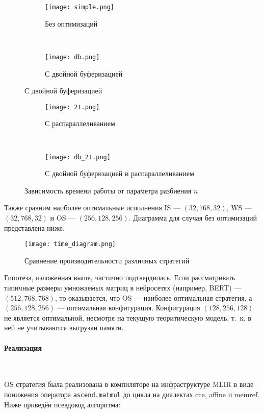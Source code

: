 \begin{figure}[h!]
    \centering
    \begin{subfigure}{0.45 \textwidth}
        \texttt{[image: simple.png]}
        \caption{Без оптимизаций}
    \end{subfigure}
    ~
    \begin{subfigure}{0.45 \textwidth}
        \texttt{[image: db.png]}
        \caption{С двойной буферизацией}
    \end{subfigure}
\end{figure}
\begin{figure}[h!]
    \begin{subfigure}{0.45 \textwidth}
        \texttt{[image: 2t.png]}
        \caption{С распараллеливанием}
    \end{subfigure}
    ~
    \begin{subfigure}{0.45 \textwidth}
        \texttt{[image: db\_2t.png]}
        \caption{С двойной буферизацией и распараллеливанием}
    \end{subfigure}
\caption{Зависимость времени работы от параметра разбиения $n$}
\end{figure}

Также сравним наиболее оптимальные исполнения IS --- $(32, 768, 32)$,
WS --- $(32, 768, 32)$ и OS --- $(256, 128, 256)$. Диаграмма
для случая без оптимизаций представлена ниже.

\begin{figure}[h!]
    \centering
    \texttt{[image: time\_diagram.png]}
    \caption{Сравнение производительности различных стратегий}
\end{figure}

Гипотеза, изложенная выше, частично подтвердилась.
Если рассматривать типичные размеры умножаемых матриц в нейросетях (например,
BERT) --- $(512, 768, 768)$, то оказывается, что OS --- наиболее оптимальная
стратегия, а $(256, 128, 256)$ --- оптимальная конфигурация. Конфигурация
$(128, 256, 128)$ не является оптимальной, несмотря на текущую теоритическую
модель, т.~к. в ней не учитываются выгрузки памяти.

\paragraph{Реализация}~

OS стратегия была реализована в компиляторе на инфраструктуре MLIR в виде
понижения оператора \texttt{ascend.matmul} до цикла на диалектах cce,
affine и memref. Ниже приведён псевдокод алгоритма:

